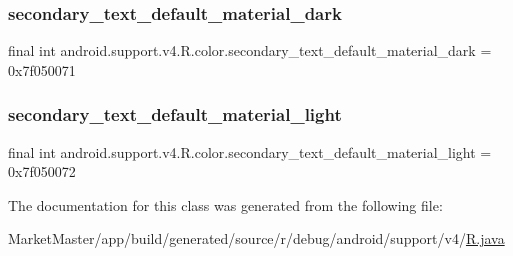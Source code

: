 \subsubsection{\texorpdfstring{secondary\+\_\+text\+\_\+default\+\_\+material\+\_\+dark}{secondary\_text\_default\_material\_dark}}
{\footnotesize\ttfamily final int android.\+support.\+v4.\+R.\+color.\+secondary\+\_\+text\+\_\+default\+\_\+material\+\_\+dark = 0x7f050071\hspace{0.3cm}{\ttfamily [static]}}

\mbox{\label{classandroid_1_1support_1_1v4_1_1R_1_1color_a3cc6c4f9f00257e09e9f62fbbcef9823}} 
\subsubsection{\texorpdfstring{secondary\+\_\+text\+\_\+default\+\_\+material\+\_\+light}{secondary\_text\_default\_material\_light}}
{\footnotesize\ttfamily final int android.\+support.\+v4.\+R.\+color.\+secondary\+\_\+text\+\_\+default\+\_\+material\+\_\+light = 0x7f050072\hspace{0.3cm}{\ttfamily [static]}}



The documentation for this class was generated from the following file\+:\begin{DoxyCompactItemize}
\item 
Market\+Master/app/build/generated/source/r/debug/android/support/v4/\mbox{\hyperlink{debug_2android_2support_2v4_2R_8java}{R.\+java}}\end{DoxyCompactItemize}
